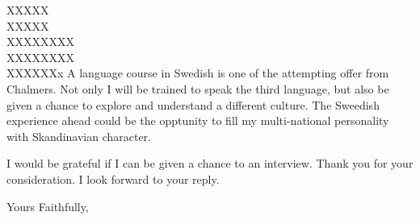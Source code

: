 \documentclass[a4,12pt]{letter}
\begin{document}
\begin{letter}{XXXXX \\ XXXXX \\ XXXXXXXX \\ XXXXXXXX \\ XXXXXXx}
A language course in Swedish is one of the attempting offer from Chalmers. Not only I will be trained to speak the third language, but also be given a chance to explore and understand a different culture. The Sweedish experience ahead could be the opptunity to fill my multi-national personality with Skandinavian character.

I would be grateful if I can be given a chance to an interview. Thank you for your consideration. I look forward to your reply.

\closing{Yours Faithfully,}

\end{letter}
\end{document}
